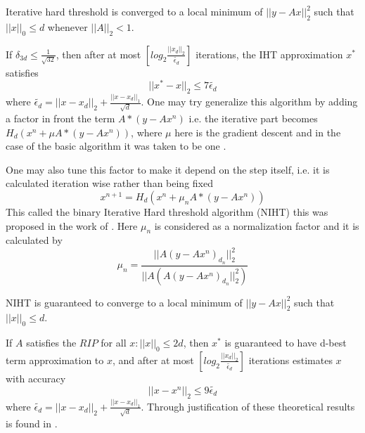 Iterative hard threshold is converged to a local minimum of $ ||y - Ax||_{2}^{2} $ such that $ ||x||_0 \leq d $ whenever $ ||A||_2 < 1.  $

If $ \delta_{3d} \leq \frac{1}{\sqrt{32}} $, then after at most $ \left[log_2 \frac{||x_d||_2}{\tilde{\epsilon_d}}\right] $ iterations, the IHT approximation $ x^* $ satisfies \begin{equation}\label{key}
||x^* - x||_2 \leq 7 \tilde{\epsilon_d}
\end{equation} where $ \tilde{\epsilon_d} = ||x - x_d||_2 + \frac{||x-x_d||_1}{\sqrt{d}}$. 
One may try generalize this algorithm by adding a factor in front the term $  A* (y - Ax^n)$ i.e. the iterative part becomes $ H_d(x^n+ \mu A* (y - Ax^n)) $, where $ \mu $ here is the gradient descent and in the case of the basic algorithm it was taken to be one \cite{bluemensath}. 

One may also tune this factor to make it depend on the step itself, i.e. it is calculated iteration wise rather than being fixed \begin{equation*}\label{key}
x^{n+1} = H_d(x^n+ \mu_n A* (y - Ax^n))
\end{equation*}   
This called the binary Iterative Hard threshold algorithm (NIHT) this was proposed in the work of  \cite{bluementh}. Here $ \mu_n $ is considered as a normalization factor and it is calculated by \begin{equation*}\label{key}
\mu_n = \frac{||A(y-Ax^n)_{d_n}||_{2}^{2}}{||A(A(y-Ax^n)_{d_n}||_{2}^{2})}
\end{equation*}

NIHT is guaranteed to converge to a local minimum of $ ||y - Ax||_{2}^{2} $ such that $ ||x||_0 \leq
 d$. 
 
 If $ A $ satisfies the $ RIP $ for all $ x: ||x||_0 \leq 2d $, then $ x^* $ is guaranteed to have d-best term approximation to $ x $, and after at most $ \left[log_2 \frac{||x_d||_2}{\tilde{\epsilon_d}}\right] $ iterations estimates $ x $ with accuracy \begin{equation*}\label{key}
 ||x-x^n||_2 \leq 9 \tilde{\epsilon_d} 
 \end{equation*} where $ \tilde{\epsilon_d} = ||x - x_d||_2 + \frac{||x-x_d||_1}{\sqrt{d}}$. Through justification of these theoretical results is found in \cite{bluemensath}. 
 \newpage

